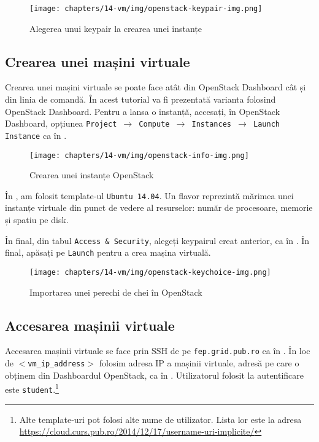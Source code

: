 \begin{figure}[!htbp]
	\centering
	\texttt{[image: chapters/14-vm/img/openstack-keypair-img.png]}
	\caption{Alegerea unui keypair la crearea unei instanțe}
	\label{fig:vm:openstack-keypair}
\end{figure}

\subsection{Crearea unei mașini virtuale}
\label{sec:vm:upb-openstack:createvm}

Crearea unei mașini virtuale se poate face atât din OpenStack Dashboard cât și
din linia de comandă. În acest tutorial va fi prezentată varianta folosind
OpenStack Dashboard. Pentru a lansa o instanță, accesați, în OpenStack Dashboard, opțiunea
\texttt{Project $\rightarrow$ Compute $\rightarrow$ Instances $\rightarrow$ Launch Instance} ca în .

\begin{figure}[!htbp]
	\centering
	\texttt{[image: chapters/14-vm/img/openstack-info-img.png]}
	\caption{Crearea unei instanțe OpenStack}
	\label{fig:vm:openstack-info-img}
\end{figure}

În , am folosit template-ul \texttt{Ubuntu 14.04}. Un flavor reprezintă
mărimea unei instanțe virtuale din punct de vedere al resurselor: număr de
procesoare, memorie și spatiu pe disk.

În final, din tabul \texttt{Access \& Security}, alegeți keypairul creat anterior, ca în . În final, apăsați pe \texttt{Launch} pentru a crea mașina virtuală.

\begin{figure}[!htbp]
	\centering
	\texttt{[image: chapters/14-vm/img/openstack-keychoice-img.png]}
	\caption{Importarea unei perechi de chei în OpenStack}
	\label{fig:vm:openstack-keychoice}
\end{figure}

\subsection{Accesarea mașinii virtuale}
\label{sec:vm:upb-openstack:vm-access}

Accesarea mașinii virtuale se face prin SSH de pe \texttt{fep.grid.pub.ro} ca în .
În loc de \texttt{$<$vm\_ip\_address$>$} folosim adresa IP a mașinii virtuale, adresă pe care o obținem din Dashboardul OpenStack, ca în .  Utilizatorul folosit la autentificare este \texttt{student}.\footnote{Alte template-uri pot folosi alte nume de utilizator. Lista lor este la adresa \url{https://cloud.curs.pub.ro/2014/12/17/username-uri-implicite/}}

